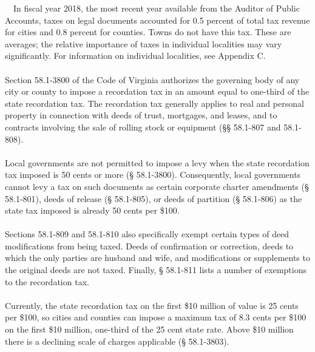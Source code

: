 \documentclass[
]{book}
\begin{document}
~~In fiscal year 2018, the most recent year available from the Auditor of Public Accounts, taxes on legal documents accounted for 0.5 percent of total tax revenue for cities and 0.8 percent for counties. Towns do not have this tax. These are averages; the relative importance of taxes in individual localities may vary significantly. For information on individual localities, see Appendix C.\\
~\\
\hspace*{0.333em}\hspace*{0.333em}Section 58.1-3800 of the Code of Virginia authorizes the governing body of any city or county to impose a recordation tax in an amount equal to one-third of the state recordation tax. The recordation tax generally applies to real and personal property in connection with deeds of trust, mortgages, and leases, and to contracts involving the sale of rolling stock or equipment (§§ 58.1-807 and 58.1-808).\\
~\\
\hspace*{0.333em}\hspace*{0.333em}Local governments are not permitted to impose a levy when the state recordation tax imposed is 50 cents or more (§ 58.1-3800). Consequently, local governments cannot levy a tax on such documents as certain corporate charter amendments (§ 58.1-801), deeds of release (§ 58.1-805), or deeds of partition (§ 58.1-806) as the state tax imposed is already 50 cents per \$100.\\
~\\
\hspace*{0.333em}\hspace*{0.333em}Sections 58.1-809 and 58.1-810 also specifically exempt certain types of deed modifications from being taxed. Deeds of confirmation or correction, deeds to which the only parties are husband and wife, and modifications or supplements to the original deeds are not taxed. Finally, § 58.1-811 lists a number of exemptions to the recordation tax.\\
~\\
\hspace*{0.333em}\hspace*{0.333em}Currently, the state recordation tax on the first \$10 million of value is 25 cents per \$100, so cities and counties can impose a maximum tax of 8.3 cents per \$100 on the first \$10 million, one-third of the 25 cent state rate. Above \$10 million there is a declining scale of charges applicable (§ 58.1-3803).\\
\end{document}
